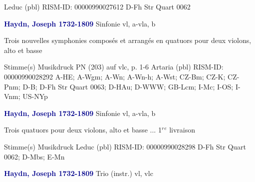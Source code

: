 \documentclass[twocolumn]{book}
\begin{document}
\newline Leduc  (pbl)
\newline RISM-ID: 00000990027612
\newline D-Fh  Str Quart 0062
\newline \par \vspace{7pt} \textcolor{darkblue}{\textbf{Haydn, Joseph  1732-1809}}
\newline Sinfonie
 vl, a-vla, b
\newline \begin{itshape}Trois nouvelles symphonies composés et arrangés en quatuors pour deux violons, alto et basse\end{itshape} 
\newline \textcolor{darkblue}{}  Stimme(s)
\newline Musikdruck
\newline PN (203) auf vlc, p. 1-6
\newline Artaria  (pbl)
\newline RISM-ID: 00000990028292
\newline A-HE; A-Wgm; A-Wn; A-Wn-h; A-Wst; CZ-Bm; CZ-K; CZ-Pnm; D-B; D-Fh  Str Quart 0063; D-HAu; D-WWW; GB-Lcm; I-Mc; I-OS; I-Vnm; US-NYp
\newline \par \vspace{7pt} \textcolor{darkblue}{\textbf{Haydn, Joseph  1732-1809}}
\newline Sinfonie
 vl, a-vla, b
\newline \begin{itshape}Trois quatuors pour deux violons, alto et basse ... 1$^r$$^e$ livraison\end{itshape} 
\newline \textcolor{darkblue}{}  Stimme(s)
\newline Musikdruck
\newline Leduc  (pbl)
\newline RISM-ID: 00000990028298
\newline D-Fh  Str Quart 0062; D-Mbs; E-Mn
\newline \par \vspace{7pt} \textcolor{darkblue}{\textbf{Haydn, Joseph  1732-1809}}
\newline Trio (instr.)
 vl, vlc
\end{document}
